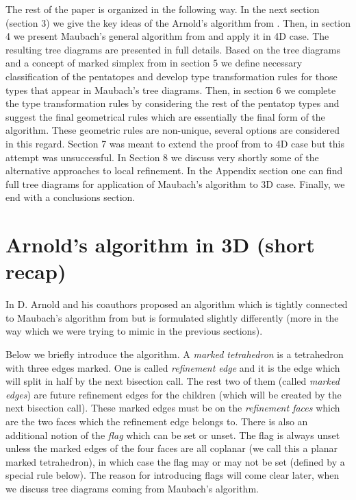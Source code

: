 \documentclass[a4paper,12pt]{amsart}
\numberwithin{equation}{section}
\begin{document}
The rest of the paper is organized in the following way.
In the next section (section 3) we give the key ideas of the Arnold's algorithm from \cite{arnold}.
Then, in section 4 we present Maubach's general algorithm from \cite{maubach} and apply it in 4D case. The resulting tree diagrams are presented in full details. Based on the tree diagrams and a concept of marked simplex from \cite{arnold} in section 5 we define necessary classification of the pentatopes and develop type transformation rules for those types that appear in Maubach's tree diagrams.
Then, in section 6 we complete the type transformation rules by considering the rest of the pentatop types and suggest the final geometrical rules which are essentially the final form of the algorithm. These geometric rules are non-unique, several options are considered in this regard.
Section 7 was meant to extend the proof from \cite{arnold} to 4D case but this attempt was unsuccessful. In Section 8 we discuss very shortly some of the alternative approaches to local refinement.
In the Appendix section one can find full tree diagrams for application of Maubach's algorithm to 3D case.
Finally, we end with a conclusions section.


\section{Arnold's algorithm in 3D (short recap)}

In \cite{arnold} D. Arnold and his coauthors proposed an algorithm which is tightly connected to Maubach's algorithm from \cite{maubach} but is formulated slightly differently (more in the way which we were trying to mimic in the previous sections).

Below we briefly introduce the algorithm. 
A \textit{marked tetrahedron} is a tetrahedron with three edges marked. One is called \textit{refinement edge} and it is the edge which will split in half by the next bisection call. The rest two of them (called \textit{marked edges}) are future refinement edges for the children (which will be created by the next bisection call). These marked edges must be on the \textit{refinement faces} which are the two faces which the refinement edge belongs to. There is also an additional notion of the \textit{flag} which can be set or unset. The flag is always unset unless the marked edges of the
four faces are all coplanar (we call this a planar marked tetrahedron), in which case
the flag may or may not be set (defined by a special rule below). The reason for introducing flags will come clear later, when we discuss tree diagrams coming from Maubach's algorithm.
\end{document}
